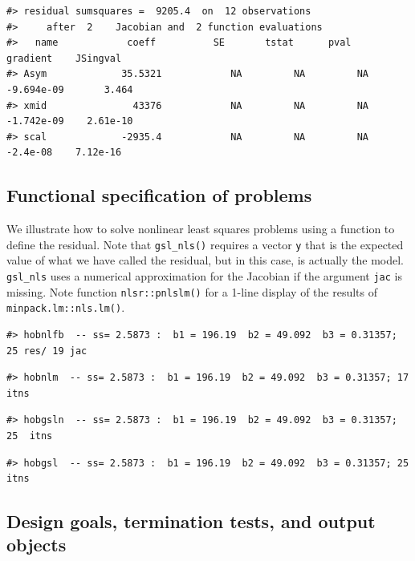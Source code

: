 \begin{verbatim}
#> residual sumsquares =  9205.4  on  12 observations
#>     after  2    Jacobian and  2 function evaluations
#>   name            coeff          SE       tstat      pval      gradient    JSingval   
#> Asym             35.5321            NA         NA         NA  -9.694e-09       3.464  
#> xmid               43376            NA         NA         NA  -1.742e-09    2.61e-10  
#> scal             -2935.4            NA         NA         NA    -2.4e-08    7.12e-16
\end{verbatim}

\subsection{Functional specification of problems}\label{functional-specification-of-problems}

We illustrate how to solve nonlinear least squares problems using
a function to define the residual. Note that \texttt{gsl\_nls()} requires
a vector \texttt{y} that is the expected value of what we have called the
residual, but in this case, is actually the model. \texttt{gsl\_nls} uses
a numerical approximation for the Jacobian if the argument \texttt{jac}
is missing. Note function \texttt{nlsr::pnlslm()} for a 1-line display of
the results of \texttt{minpack.lm::nls.lm()}.

\begin{verbatim}
#> hobnlfb  -- ss= 2.5873 :  b1 = 196.19  b2 = 49.092  b3 = 0.31357; 25 res/ 19 jac
\end{verbatim}

\begin{verbatim}
#> hobnlm  -- ss= 2.5873 :  b1 = 196.19  b2 = 49.092  b3 = 0.31357; 17  itns
\end{verbatim}

\begin{verbatim}
#> hobgsln  -- ss= 2.5873 :  b1 = 196.19  b2 = 49.092  b3 = 0.31357; 25  itns
\end{verbatim}

\begin{verbatim}
#> hobgsl  -- ss= 2.5873 :  b1 = 196.19  b2 = 49.092  b3 = 0.31357; 25  itns
\end{verbatim}

\subsection{Design goals, termination tests, and output objects}\label{design-goals-termination-tests-and-output-objects}

